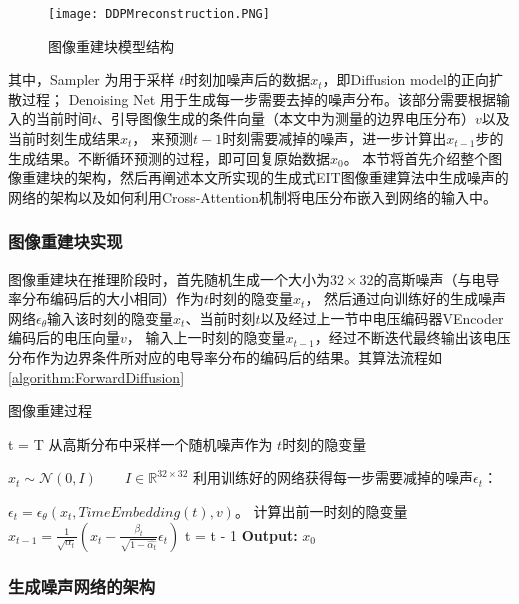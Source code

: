 \begin{figure}[h]
    \centering
    \texttt{[image: DDPMreconstruction.PNG]}
    \caption{图像重建块模型结构}
    \label{figure:DDPMreconstruction}
\end{figure}

其中，Sampler 为用于采样 $t$时刻加噪声后的数据$x_t$，即Diffusion model的正向扩散过程；
Denoising Net 用于生成每一步需要去掉的噪声分布。该部分需要根据输入的当前时间$t$、引导图像生成的条件向量（本文中为测量的边界电压分布）$v$以及当前时刻生成结果$x_t$，
来预测$t-1$时刻需要减掉的噪声，进一步计算出$x_{t-1}$步的生成结果。不断循环预测的过程，即可回复原始数据$x_0$。
本节将首先介绍整个图像重建块的架构，然后再阐述本文所实现的生成式EIT图像重建算法中生成噪声的网络的架构以及如何利用Cross-Attention机制将电压分布嵌入到网络的输入中。

\subsubsection{图像重建块实现}

图像重建块在推理阶段时，首先随机生成一个大小为$32\times 32$的高斯噪声（与电导率分布编码后的大小相同）作为$t$时刻的隐变量$x_t$，
然后通过向训练好的生成噪声网络$\epsilon_\theta$输入该时刻的隐变量$x_t$、当前时刻$t$以及经过上一节中电压编码器VEncoder编码后的电压向量$v$，
输入上一时刻的隐变量$x_{t-1}$，经过不断迭代最终输出该电压分布作为边界条件所对应的电导率分布的编码后的结果。其算法流程如\cref{algorithm:ForwardDiffusion}

\begin{algorithm}[H]
    
    \caption{图像重建过程}
    \begin{algorithmic}[1]
        \State t = T
        \State 从高斯分布中采样一个随机噪声作为 $t$时刻的隐变量
        
        $x_t \sim \mathcal{N}(0, I) \qquad I \in \mathbb{R}^{32 \times 32}$
        \State 利用训练好的网络获得每一步需要减掉的噪声$\epsilon_t$：
        
        $\epsilon_t = \epsilon_\theta(x_t, TimeEmbedding(t), v)$。
        \State 计算出前一时刻的隐变量$x_{t-1} = \frac{1}{\sqrt{\alpha_t}}(x_t - \frac{\beta_t}{\sqrt{1-\hat{\alpha_t}}}\epsilon_t)$
        \State t = t - 1
        \EndWhile
        \State \textbf{Output:} $x_0$
    \end{algorithmic}
    \label{algorithm:ForwardDiffusion}
\end{algorithm}

\subsubsection{生成噪声网络的架构}


